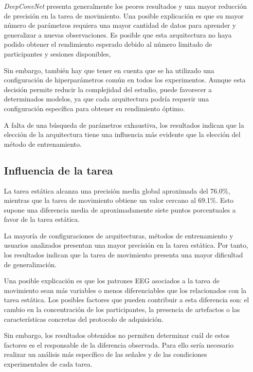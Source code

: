 \textit{DeepConvNet} presenta generalmente los peores resultados y una mayor reducción de precisión en la tarea de movimiento. Una posible explicación es que su mayor número de parámetros requiera una mayor cantidad de datos para aprender y generalizar a nuevas observaciones. Es posible que esta arquitectura no haya podido obtener el rendimiento esperado debido al número limitado de participantes y sesiones disponibles,

Sin embargo, también hay que tener en cuenta que se ha utilizado una configuración de hiperparámetros común en todos los experimentos. Aunque esta decisión permite reducir la complejidad del estudio, puede favorecer a determinados modelos, ya que cada arquitectura podría requerir una configuración específica para obtener su rendimiento óptimo.

A falta de una búsqueda de parámetros exhaustiva, los resultados indican que la elección de la arquitectura tiene una influencia más evidente que la elección del método de entrenamiento.

\subsection{Influencia de la tarea}

La tarea estática alcanza una precisión media global aproximada del 76.0\%, mientras que la tarea de movimiento obtiene un valor cercano al 69.1\%. Esto supone una diferencia media de aproximadamente siete puntos porcentuales a favor de la tarea estática.

La mayoría de configuraciones de arquitecturas, métodos de entrenamiento y usuarios analizados presentan una mayor precisión en la tarea estática. Por tanto, los resultados indican que la tarea de movimiento presenta una mayor dificultad de generalización.

Una posible explicación es que los patrones EEG asociados a la tarea de movimiento sean más variables o menos diferenciables que los relacionados con la tarea estática. Los posibles factores que pueden contribuir a esta diferencia son: el cambio en la concentración de los participantes, la presencia de artefactos o las características concretas del protocolo de adquisición.

Sin embargo, los resultados obtenidos no permiten determinar cuál de estos factores es el responsable de la diferencia observada. Para ello sería necesario realizar un análisis más específico de las señales y de las condiciones experimentales de cada tarea.

